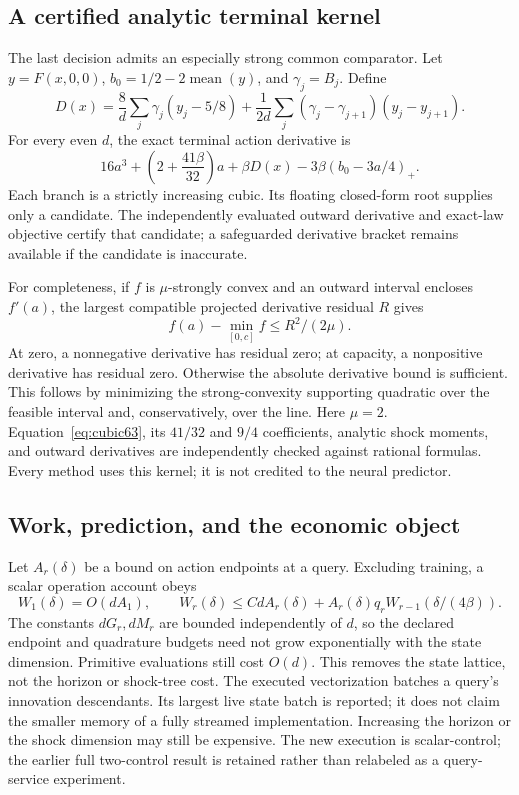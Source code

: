 \subsection{A certified analytic terminal kernel}
The last decision admits an especially strong common comparator. Let $y=F(x,0,0)$, $b_0=1/2-2\operatorname{mean}(y)$, and $\gamma_j=B_j$. Define
\[
 D(x)=\frac8d\sum_j\gamma_j(y_j-5/8)
   +\frac1{2d}\sum_j(\gamma_j-\gamma_{j+1})(y_j-y_{j+1}).
\]
For every even $d$, the exact terminal action derivative is
\begin{equation}\label{eq:cubic63}
 16a^3+\left(2+\frac{41\beta}{32}\right)a
 +\beta D(x)-3\beta(b_0-3a/4)_+.
\end{equation}
Each branch is a strictly increasing cubic. Its floating closed-form root supplies only a candidate. The independently evaluated outward derivative and exact-law objective certify that candidate; a safeguarded derivative bracket remains available if the candidate is inaccurate.

For completeness, if $f$ is $\mu$-strongly convex and an outward interval encloses $f'(a)$, the largest compatible projected derivative residual $R$ gives
\[
 f(a)-\min_{[0,c]}f\le R^2/(2\mu).
\]
At zero, a nonnegative derivative has residual zero; at capacity, a nonpositive derivative has residual zero. Otherwise the absolute derivative bound is sufficient. This follows by minimizing the strong-convexity supporting quadratic over the feasible interval and, conservatively, over the line. Here $\mu=2$. Equation~\eqref{eq:cubic63}, its $41/32$ and $9/4$ coefficients, analytic shock moments, and outward derivatives are independently checked against rational formulas. Every method uses this kernel; it is not credited to the neural predictor.

\subsection{Work, prediction, and the economic object}
Let $A_r(\delta)$ be a bound on action endpoints at a query. Excluding training, a scalar operation account obeys
\[
 W_1(\delta)=O(dA_1),\qquad
 W_r(\delta)\le C d A_r(\delta)+
 A_r(\delta)q_r W_{r-1}(\delta/(4\beta)).
\]
The constants $dG_r,dM_r$ are bounded independently of $d$, so the declared endpoint and quadrature budgets need not grow exponentially with the state dimension. Primitive evaluations still cost $O(d)$. This removes the state lattice, not the horizon or shock-tree cost. The executed vectorization batches a query's innovation descendants. Its largest live state batch is reported; it does not claim the smaller memory of a fully streamed implementation. Increasing the horizon or the shock dimension may still be expensive. The new execution is scalar-control; the earlier full two-control result is retained rather than relabeled as a query-service experiment.

